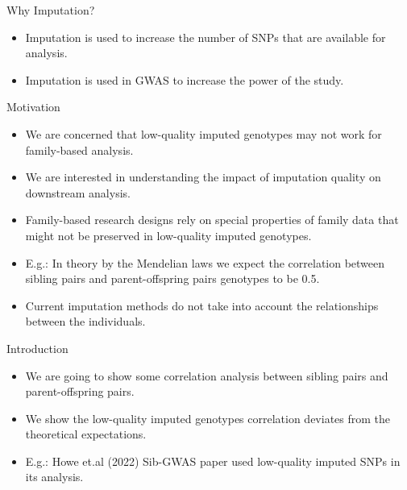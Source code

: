 \documentclass{beamer}
\begin{document}
\begin{frame}{Why Imputation?}
      \begin{itemize}
            \item Imputation is used to increase the number of SNPs that are available for analysis.
            \item Imputation is used in GWAS to increase the power of the study.
      \end{itemize}
\end{frame}

\begin{frame}{Motivation}
      \begin{itemize}
            \item We are concerned that low-quality imputed genotypes may not work for family-based analysis. %
            \item We are interested in understanding the impact of imputation quality on downstream analysis.
            \item Family-based research designs rely on special properties of family data that might not be preserved in low-quality imputed genotypes.
            \item E.g.: In theory by the Mendelian laws we expect the correlation between sibling pairs and parent-offspring pairs genotypes to be 0.5.
            \item Current imputation methods do not take into account the relationships between the individuals.
      \end{itemize}
\end{frame}

\begin{frame}{Introduction}
      \begin{itemize}
            \item We are going to show some correlation analysis between sibling pairs and parent-offspring pairs.
            \item We show the low-quality imputed genotypes correlation deviates from the theoretical expectations.
            \item E.g.: Howe et.al (2022) Sib-GWAS paper used low-quality imputed SNPs in its analysis.
      \end{itemize}
\end{frame}
\end{document}
